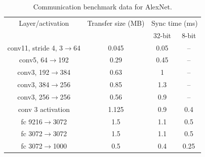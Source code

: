 \documentclass{article} %
\begin{document}
\begin{table}[h]
	\caption{Communication benchmark data for AlexNet. }
	\label{sample-table}
	\begin{minipage}
		{\linewidth}
		\centering
		\begin{tabular}{ cccc}
			\toprule[1.5pt]
			Layer/activation  & Transfer size (MB) &  \multicolumn{2}{c}{Sync time (ms)}  \\
			& & 32-bit & 8-bit \\
			\midrule
			conv11, stride 4, 3$\rightarrow$64 &   0.045 & 0.05 &-- \\
			conv5, 64$\rightarrow$192 &  0.29 &  0.45 & -- \\
			conv3, 192$\rightarrow$384 &  0.63 & 1  & --\\
			conv3, 384$\rightarrow$256 &   0.85 & 1.3 & -- \\
			conv3, 256$\rightarrow$256 &  0.56 & 0.9 & -- \\\midrule
			conv 3 activation &  1.125 & 0.9 & 0.4 \\
			fc 9216$\rightarrow$3072 &  1.5 & 1.1 &  0.5\\
			fc 3072$\rightarrow$3072 &  1.5 & 1.1 & 0.5\\
			fc 3072$\rightarrow$1000 &  0.5 & 0.4& 0.25\\\midrule
			
			\bottomrule[1.25pt]
		\end{tabular}
		\par
		\bigskip
	\end{minipage}
\end{table}
\end{document}

